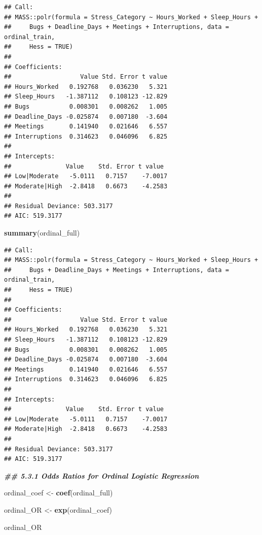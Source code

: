 \documentclass[
]{article}
\newenvironment{Shaded}{\begin{snugshade}}{\end{snugshade}}
\newcommand{\DocumentationTok}[1]{\textcolor[rgb]{0.56,0.35,0.01}{\textbf{\textit{#1}}}}
\newcommand{\FunctionTok}[1]{\textcolor[rgb]{0.13,0.29,0.53}{\textbf{#1}}}
\newcommand{\NormalTok}[1]{#1}
\newcommand{\OtherTok}[1]{\textcolor[rgb]{0.56,0.35,0.01}{#1}}
\begin{document}
\begin{verbatim}
## Call:
## MASS::polr(formula = Stress_Category ~ Hours_Worked + Sleep_Hours + 
##     Bugs + Deadline_Days + Meetings + Interruptions, data = ordinal_train, 
##     Hess = TRUE)
## 
## Coefficients:
##                   Value Std. Error t value
## Hours_Worked   0.192768   0.036230   5.321
## Sleep_Hours   -1.387112   0.108123 -12.829
## Bugs           0.008301   0.008262   1.005
## Deadline_Days -0.025874   0.007180  -3.604
## Meetings       0.141940   0.021646   6.557
## Interruptions  0.314623   0.046096   6.825
## 
## Intercepts:
##               Value    Std. Error t value 
## Low|Moderate   -5.0111   0.7157    -7.0017
## Moderate|High  -2.8418   0.6673    -4.2583
## 
## Residual Deviance: 503.3177 
## AIC: 519.3177
\end{verbatim}

\begin{Shaded}
\begin{Highlighting}[]
\FunctionTok{summary}\NormalTok{(ordinal\_full)}
\end{Highlighting}
\end{Shaded}

\begin{verbatim}
## Call:
## MASS::polr(formula = Stress_Category ~ Hours_Worked + Sleep_Hours + 
##     Bugs + Deadline_Days + Meetings + Interruptions, data = ordinal_train, 
##     Hess = TRUE)
## 
## Coefficients:
##                   Value Std. Error t value
## Hours_Worked   0.192768   0.036230   5.321
## Sleep_Hours   -1.387112   0.108123 -12.829
## Bugs           0.008301   0.008262   1.005
## Deadline_Days -0.025874   0.007180  -3.604
## Meetings       0.141940   0.021646   6.557
## Interruptions  0.314623   0.046096   6.825
## 
## Intercepts:
##               Value    Std. Error t value 
## Low|Moderate   -5.0111   0.7157    -7.0017
## Moderate|High  -2.8418   0.6673    -4.2583
## 
## Residual Deviance: 503.3177 
## AIC: 519.3177
\end{verbatim}

\begin{Shaded}
\begin{Highlighting}[]
\DocumentationTok{\#\# 5.3.1 Odds Ratios for Ordinal Logistic Regression}

\NormalTok{ordinal\_coef }\OtherTok{\textless{}{-}} \FunctionTok{coef}\NormalTok{(ordinal\_full)}

\NormalTok{ordinal\_OR }\OtherTok{\textless{}{-}} \FunctionTok{exp}\NormalTok{(ordinal\_coef)}

\NormalTok{ordinal\_OR}
\end{Highlighting}
\end{Shaded}
\end{document}
